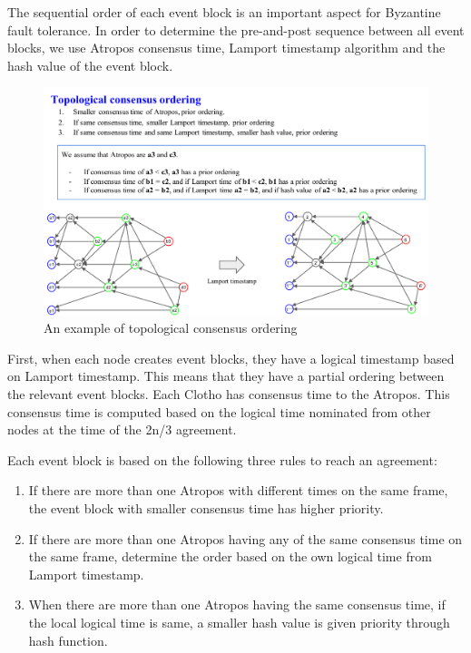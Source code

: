 \documentclass{article}
\begin{document}
The sequential order of each event block is an important aspect for Byzantine fault tolerance. In order to determine the pre-and-post sequence between all event blocks, we use Atropos consensus time, Lamport timestamp algorithm and the hash value of the event block.

\newpage

\begin{figure}[H] \centering  
	\includegraphics[width=1.0\textwidth]{topological_ordering_rule.pdf}
	\caption{An example of topological consensus ordering}
	\label{fig:topological consensus ordering}
\end{figure}

First, when each node creates event blocks, they have a logical timestamp based on Lamport timestamp. This means that they have a partial ordering between the relevant event blocks. 
Each Clotho has consensus time to the Atropos. This consensus time is computed based on the logical time nominated from other nodes at the time of the 2n/3 agreement.

Each event block is based on the following three rules to reach an agreement:

\begin{enumerate}
\item If there are more than one Atropos with different times on the same frame, the event block with smaller consensus time has higher priority.
\item If there are more than one Atropos having any of the same consensus time on the same frame, determine the order based on the own logical time from Lamport timestamp.
\item When there are more than one Atropos having the same consensus time, if the local logical time is same, a smaller hash value is given priority through hash function.
\end{enumerate}
\end{document}
